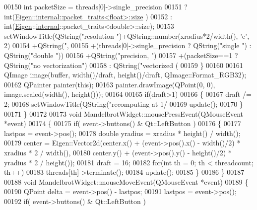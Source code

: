 \begin{DoxyCode}
00150     \textcolor{keywordtype}{int} packetSize = threads[0]->single\_precision
00151                    ? int(\hyperlink{struct_eigen_1_1internal_1_1packet__traits}{Eigen::internal::packet\_traits<float>::size}
      )
00152                    : int(\hyperlink{namespace_eigen}{Eigen}::\hyperlink{namespaceinternal}{internal}::packet\_traits<double>::size);
00153     setWindowTitle(QString(\textcolor{stringliteral}{"resolution "})+QString::number(xradius*2/width(), \textcolor{charliteral}{'e'}, 2)
00154                   +QString(\textcolor{stringliteral}{", %
00155                   +(threads[0]->single\_precision ? QString(\textcolor{stringliteral}{"single "}) : QString(\textcolor{stringliteral}{"double "}))
00156                   +QString(\textcolor{stringliteral}{"precision, "})
00157                   +(packetSize==1 ? QString(\textcolor{stringliteral}{"no vectorization"})
00158                                   : QString(\textcolor{stringliteral}{"vectorized (%
00159   \}
00160   
00161   QImage image(buffer, width()/draft, height()/draft, QImage::Format\_RGB32);
00162   QPainter painter(\textcolor{keyword}{this});
00163   painter.drawImage(QPoint(0, 0), image.scaled(width(), height()));
00164 
00165   \textcolor{keywordflow}{if}(draft>1)
00166   \{
00167     draft /= 2;
00168     setWindowTitle(QString(\textcolor{stringliteral}{"recomputing at 1/%
00169     update();
00170   \}
00171 \}
00172 
00173 \textcolor{keywordtype}{void} MandelbrotWidget::mousePressEvent(QMouseEvent *event)
00174 \{
00175   \textcolor{keywordflow}{if}( event->buttons() & Qt::LeftButton )
00176   \{
00177     lastpos = \textcolor{keyword}{event}->pos();
00178     \textcolor{keywordtype}{double} yradius = xradius * height() / width();
00179     center = Eigen::Vector2d(center.x() + (\textcolor{keyword}{event}->pos().x() - width()/2) * xradius * 2 / width(),
00180                              center.y() + (\textcolor{keyword}{event}->pos().y() - height()/2) * yradius * 2 / height());
00181     draft = 16;
00182     \textcolor{keywordflow}{for}(\textcolor{keywordtype}{int} th = 0; th < threadcount; th++)
00183       threads[th]->terminate();
00184     update();
00185   \}
00186 \}
00187 
00188 \textcolor{keywordtype}{void} MandelbrotWidget::mouseMoveEvent(QMouseEvent *event)
00189 \{
00190   QPoint delta = \textcolor{keyword}{event}->pos() - lastpos;
00191   lastpos = \textcolor{keyword}{event}->pos();
00192   \textcolor{keywordflow}{if}( event->buttons() & Qt::LeftButton )
}}}
\end{DoxyCode}
